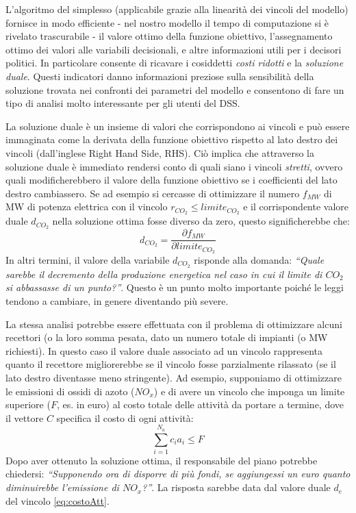 L'algoritmo del simplesso (applicabile grazie alla linearità dei vincoli del modello) fornisce in modo efficiente - nel nostro modello il tempo di computazione si è rivelato trascurabile - il valore ottimo della funzione obiettivo, l'assegnamento ottimo dei valori alle variabili decisionali, e altre informazioni utili per i decisori politici. In particolare consente di ricavare i cosiddetti \emph{costi ridotti} e la \emph{soluzione duale}. Questi indicatori danno informazioni preziose sulla sensibilità della soluzione trovata nei confronti dei parametri del modello e consentono di fare un tipo di analisi molto interessante per gli utenti del DSS.

La soluzione duale è un insieme di valori che corrispondono ai vincoli e può essere immaginata come la derivata della funzione obiettivo rispetto al lato destro dei vincoli (dall'inglese Right Hand Side, RHS). Ciò implica che attraverso la soluzione duale è immediato rendersi conto di quali siano i vincoli \emph{stretti}, ovvero quali modificherebbero il valore della funzione obiettivo se i coefficienti del lato destro cambiassero. Se ad esempio si cercasse di ottimizzare il numero $f_{MW}$ di MW di potenza elettrica con il vincolo $r_{CO_2} \leq limite_{CO_2}$ e il corrispondente valore duale $d_{CO_2}$ nella soluzione ottima fosse diverso da zero, questo significherebbe che:
\begin{equation}
\label{eq:sensAnal}
	d_{CO_2} = \frac{\partial f_{MW}}{\partial limite_{CO_2}}
\end{equation}
In altri termini, il valore della variabile $d_{CO_2}$ risponde alla domanda: \emph{``Quale sarebbe il decremento della produzione energetica nel caso in cui il limite di $CO_2$ si abbassasse di un punto?''}. Questo è un punto molto importante poiché le leggi tendono a cambiare, in genere diventando più severe. 

La stessa analisi potrebbe essere effettuata con il problema di ottimizzare alcuni recettori (o la loro somma pesata, dato un numero totale di impianti (o MW richiesti). In questo caso il valore duale associato ad un vincolo rappresenta quanto il recettore migliorerebbe se il vincolo fosse parzialmente rilassato (se il lato destro diventasse meno stringente). Ad esempio, supponiamo di ottimizzare le emissioni di ossidi di azoto ($NO_x$) e di avere un vincolo che imponga un limite superiore ($F$, es. in euro) al costo totale delle attività da portare a termine, dove il vettore $C$ specifica il costo di ogni attività: 
\begin{equation}
\label{eq:costoAtt}
	\sum_{i=1}^{N_a} c_i a_i \leq F
\end{equation}
Dopo aver ottenuto la soluzione ottima, il responsabile del piano potrebbe chiedersi: \emph{``Supponendo ora di disporre di più fondi, se aggiungessi un euro quanto diminuirebbe l'emissione di $NO_x$?''}. La risposta sarebbe data dal valore duale $d_e$ del vincolo \ref{eq:costoAtt}.

